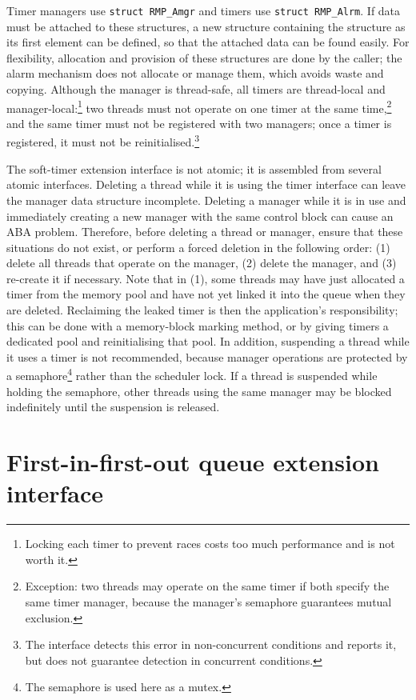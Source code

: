 Timer managers use \texttt{struct RMP\_Amgr} and timers use \texttt{struct RMP\_Alrm}.
If data must be attached to these structures, a new structure containing the structure as its first element can be defined, so that the attached data can be found easily.
For flexibility, allocation and provision of these structures are done by the caller; the alarm mechanism does not allocate or manage them, which avoids waste and copying.
Although the manager is thread-safe, all timers are thread-local and manager-local:\footnote{Locking each timer to prevent races costs too much performance and is not worth it.} two threads must not operate on one timer at the same time,\footnote{Exception: two threads may operate on the same timer if both specify the same timer manager, because the manager's semaphore guarantees mutual exclusion.} and the same timer must not be registered with two managers; once a timer is registered, it must not be reinitialised.\footnote{The interface detects this error in non-concurrent conditions and reports it, but does not guarantee detection in concurrent conditions.}

The soft-timer extension interface is not atomic; it is assembled from several atomic interfaces.
Deleting a thread while it is using the timer interface can leave the manager data structure incomplete.
Deleting a manager while it is in use and immediately creating a new manager with the same control block can cause an ABA problem.
Therefore, before deleting a thread or manager, ensure that these situations do not exist, or perform a forced deletion in the following order: (1) delete all threads that operate on the manager, (2) delete the manager, and (3) re-create it if necessary.
Note that in (1), some threads may have just allocated a timer from the memory pool and have not yet linked it into the queue when they are deleted.
Reclaiming the leaked timer is then the application's responsibility; this can be done with a memory-block marking method, or by giving timers a dedicated pool and reinitialising that pool.
In addition, suspending a thread while it uses a timer is not recommended, because manager operations are protected by a semaphore\footnote{The semaphore is used here as a mutex.} rather than the scheduler lock.
If a thread is suspended while holding the semaphore, other threads using the same manager may be blocked indefinitely until the suspension is released.

\section{First-in-first-out queue extension interface}

